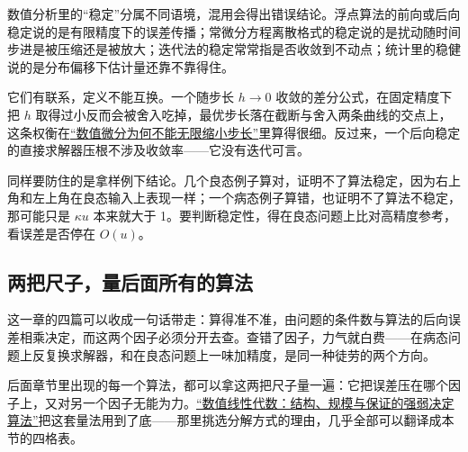 数值分析里的``稳定''分属不同语境，混用会得出错误结论。浮点算法的前向或后向稳定说的是有限精度下的误差传播；常微分方程离散格式的稳定说的是扰动随时间步进是被压缩还是被放大；迭代法的稳定常常指是否收敛到不动点；统计里的稳健说的是分布偏移下估计量还靠不靠得住。

它们有联系，定义不能互换。一个随步长 \(h\to0\) 收敛的差分公式，在固定精度下把 \(h\) 取得过小反而会被舍入吃掉，最优步长落在截断与舍入两条曲线的交点上，这条权衡在\hyperref[sec:08-Numerical-Analysis/04-Numerical-Differentiation-and-Integration/01]{``数值微分为何不能无限缩小步长''}里算得很细。反过来，一个后向稳定的直接求解器压根不涉及收敛率——它没有迭代可言。

同样要防住的是拿样例下结论。几个良态例子算对，证明不了算法稳定，因为右上角和左上角在良态输入上表现一样；一个病态例子算错，也证明不了算法不稳定，那可能只是 \(\kappa u\) 本来就大于 1。要判断稳定性，得在良态问题上比对高精度参考，看误差是否停在 \(O(u)\)。

\subsection{两把尺子，量后面所有的算法}

这一章的四篇可以收成一句话带走：算得准不准，由问题的条件数与算法的后向误差相乘决定，而这两个因子必须分开去查。查错了因子，力气就白费——在病态问题上反复换求解器，和在良态问题上一味加精度，是同一种徒劳的两个方向。

后面章节里出现的每一个算法，都可以拿这两把尺子量一遍：它把误差压在哪个因子上，又对另一个因子无能为力。\hyperref[ch:065]{``数值线性代数：结构、规模与保证的强弱决定算法''}把这套量法用到了底——那里挑选分解方式的理由，几乎全部可以翻译成本节的四格表。
